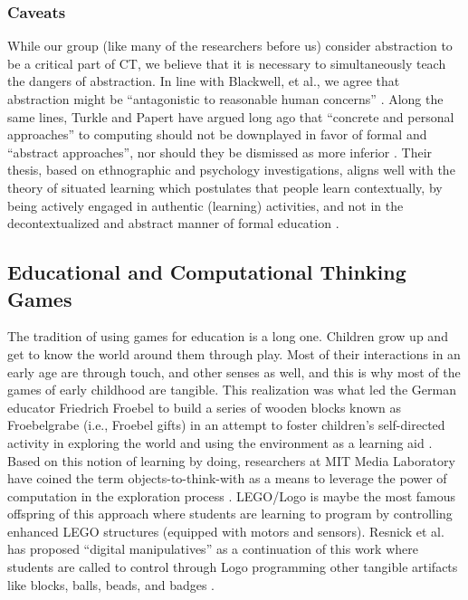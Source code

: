 \documentclass{acm_proc_article-sp}
\begin{document}
\subsubsection{Caveats}
While our group (like many of the researchers before us) consider abstraction to be a critical part of CT, we believe that it is necessary to simultaneously teach the dangers of abstraction. In line with Blackwell, et al., we agree that abstraction might be ``antagonistic to reasonable human concerns'' \cite{blackwell2008abstract}. Along the same lines, Turkle and Papert have argued long ago that ``concrete and personal approaches'' to computing should not be downplayed in favor of formal and ``abstract approaches'', nor should they be dismissed as more inferior \cite{turkle1990epistemological}. Their thesis, based on ethnographic and psychology investigations, aligns well with the theory of situated learning which postulates that people learn contextually, by being actively engaged in authentic (learning) activities, and not in the decontextualized and abstract manner of formal education \cite{brown1989situated}.

\subsection{Educational and Computational Thinking Games}
The tradition of using games for education is a long one. Children grow up and get to know the world around them through play. Most of their interactions in an early age are through touch, and other senses as well, and this is why most of the games of early childhood are tangible. This realization was what led the German educator Friedrich Froebel to build a series of wooden blocks known as Froebelgrabe (i.e., Froebel gifts) in an attempt to foster children's self-directed activity in exploring the world and using the environment as a learning aid \cite{liebschner1992child}. Based on this notion of learning by doing, researchers at MIT Media Laboratory have coined the term objects-to-think-with as a means to leverage the power of computation in the exploration process \cite{resnick1998digital,schweikardt2006roblocks}. LEGO/Logo is maybe the most famous offspring of this approach where students are learning to program by controlling enhanced LEGO structures (equipped with motors and sensors). Resnick et al. has proposed ``digital manipulatives'' as a continuation of this work where students are called to control through Logo programming other tangible artifacts like blocks, balls, beads, and badges \cite{liebschner1992child}.
\end{document}
